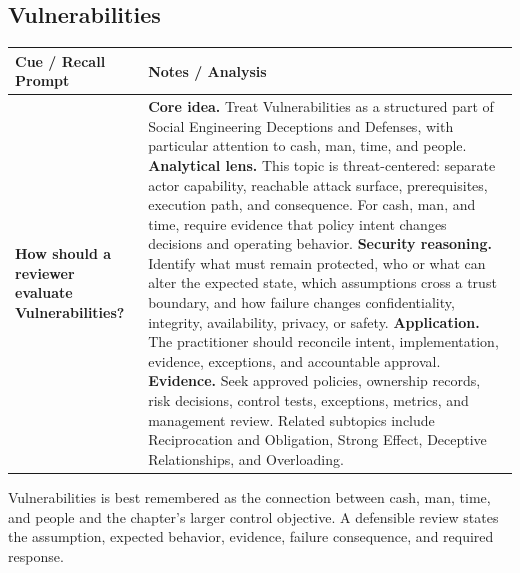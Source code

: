 \documentclass[11pt]{article}
\newcommand{\CornellHeader}{%
\rowcolor{Navy}\color{white}\bfseries Cue / Recall Prompt & \color{white}\bfseries Notes / Analysis\\\hline}
\newcommand{\CornellRow}[2]{%
\cellcolor{CueGray}\RaggedRight\textbf{#1} & \RaggedRight #2\\\hline}
\begin{document}
\subsection*{Vulnerabilities}
\begin{longtable}{>{\RaggedRight\arraybackslash}p{}|>{\RaggedRight\arraybackslash}p{}}
\CornellHeader
\CornellRow{How should a reviewer evaluate Vulnerabilities?}{\textbf{Core idea.} Treat Vulnerabilities as a structured part of Social Engineering Deceptions and Defenses, with particular attention to cash, man, time, and people. \textbf{Analytical lens.} This topic is threat-centered: separate actor capability, reachable attack surface, prerequisites, execution path, and consequence. For cash, man, and time, require evidence that policy intent changes decisions and operating behavior. \textbf{Security reasoning.} Identify what must remain protected, who or what can alter the expected state, which assumptions cross a trust boundary, and how failure changes confidentiality, integrity, availability, privacy, or safety. \textbf{Application.} The practitioner should reconcile intent, implementation, evidence, exceptions, and accountable approval. \textbf{Evidence.} Seek approved policies, ownership records, risk decisions, control tests, exceptions, metrics, and management review. Related subtopics include Reciprocation and Obligation, Strong Effect, Deceptive Relationships, and Overloading.}
\end{longtable}
\begin{topicsummary}
Vulnerabilities is best remembered as the connection between cash, man, time, and people and the chapter's larger control objective. A defensible review states the assumption, expected behavior, evidence, failure consequence, and required response.
\end{topicsummary}
\end{document}
